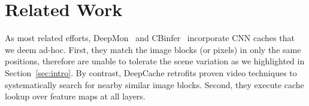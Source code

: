 \documentclass[10pt,acmtog]{acmart}
\newcommand{\framework}{DeepCache\xspace}
\newcommand{\sys}{\framework{}}
\begin{document}
\section{Related Work}\label{sec:related}%
As most related efforts, DeepMon~\cite{conf/mobisys/LocLB17} and CBinfer~\cite{cavigelli2017cbinfer}  incorporate CNN caches that we deem ad-hoc.
First, they match the image blocks (or pixels) in only the same positions, therefore are unable to tolerate the scene variation as we highlighted in Section~\ref{sec:intro}.
By contrast, \sys{} retrofits proven video techniques to systematically search for nearby similar image blocks.
Second, 
they execute cache lookup over feature maps at all layers.
\end{document}
